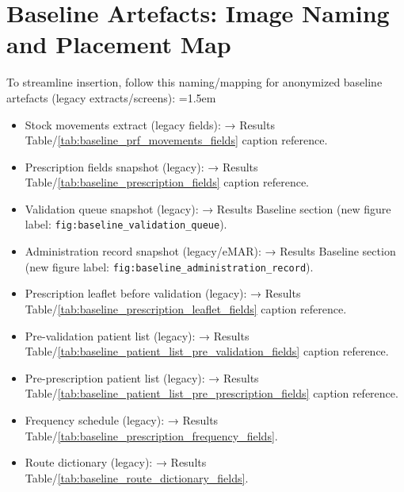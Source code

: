 \section{Baseline Artefacts: Image Naming and Placement Map}
To streamline insertion, follow this naming/mapping for anonymized baseline artefacts (legacy extracts/screens):
\begingroup\emergencystretch=1.5em
\begin{itemize}
    \item Stock movements extract (legacy fields): \texttt{} → Results Table/\ref{tab:baseline_prf_movements_fields} caption reference.
    \item Prescription fields snapshot (legacy): \texttt{} → Results Table/\ref{tab:baseline_prescription_fields} caption reference.
    \item Validation queue snapshot (legacy): \texttt{} → Results Baseline section (new figure label: \texttt{fig:baseline\_validation\_queue}).
    \item Administration record snapshot (legacy/eMAR): \texttt{} → Results Baseline section (new figure label: \texttt{fig:baseline\_administration\_record}).
    \item Prescription leaflet before validation (legacy): \texttt{} → Results Table/\ref{tab:baseline_prescription_leaflet_fields} caption reference.
    \item Pre-validation patient list (legacy): \texttt{} → Results Table/\ref{tab:baseline_patient_list_pre_validation_fields} caption reference.
    \item Pre-prescription patient list (legacy): \texttt{} → Results Table/\ref{tab:baseline_patient_list_pre_prescription_fields} caption reference.
    \item Frequency schedule (legacy): \texttt{} → Results Table/\ref{tab:baseline_prescription_frequency_fields}.
    \item Route dictionary (legacy): \texttt{} → Results Table/\ref{tab:baseline_route_dictionary_fields}.
\end{itemize}
\endgroup

